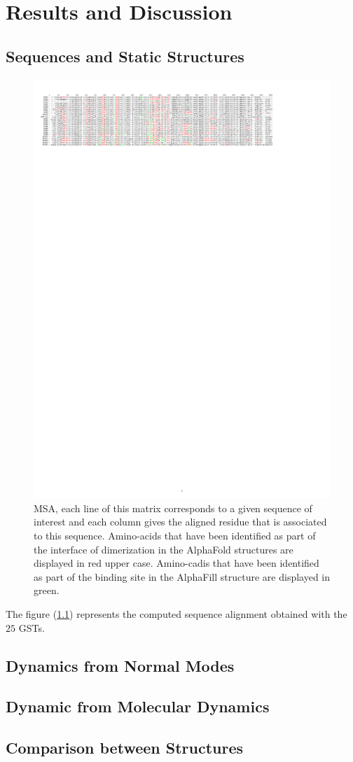 \chapter{Results and Discussion}

\section{Sequences and Static Structures}
\begin{figure}[h!]
	\label{MSA matrix}
	\centering
	\includegraphics[width = 0.99\linewidth]{figures/fig1}
	\caption{MSA, each line of this matrix corresponds to a given sequence of interest and each column gives the aligned residue that is associated to this sequence. Amino-acids that have been identified as part of the interface of dimerization in the AlphaFold structures are displayed in red upper case. Amino-cadis that have been identified as part of the binding site in the AlphaFill structure are displayed in green.}
\end{figure}
The figure (\ref{MSA matrix}) represents the computed sequence alignment obtained with the $25$ GSTs.
\section{Dynamics from Normal Modes}

\section{Dynamic from Molecular Dynamics}

\section{Comparison between Structures}